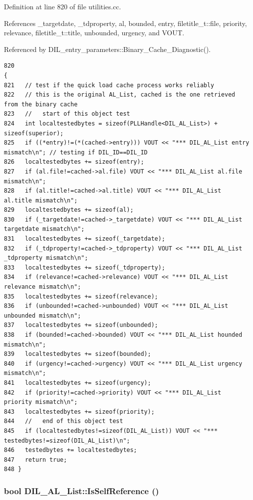 Definition at line 820 of file utilities.cc.

References \_\-targetdate, \_\-tdproperty, al, bounded, entry, filetitle\_\-t::file, priority, relevance, filetitle\_\-t::title, unbounded, urgency, and VOUT.

Referenced by DIL\_\-entry\_\-parameters::Binary\_\-Cache\_\-Diagnostic().



\footnotesize\begin{verbatim}820                                                                                  {
821   // test if the quick load cache process works reliably
822   // this is the original AL_List, cached is the one retrieved from the binary cache
823   //   start of this object test
824   int localtestedbytes = sizeof(PLLHandle<DIL_AL_List>) + sizeof(superior);
825   if ((*entry)!=(*(cached->entry))) VOUT << "*** DIL_AL_List entry mismatch\n"; // testing if DIL_ID==DIL_ID
826   localtestedbytes += sizeof(entry);
827   if (al.file!=cached->al.file) VOUT << "*** DIL_AL_List al.file mismatch\n";
828   if (al.title!=cached->al.title) VOUT << "*** DIL_AL_List al.title mismatch\n";
829   localtestedbytes += sizeof(al);
830   if (_targetdate!=cached->_targetdate) VOUT << "*** DIL_AL_List targetdate mismatch\n";
831   localtestedbytes += sizeof(_targetdate);
832   if (_tdproperty!=cached->_tdproperty) VOUT << "*** DIL_AL_List _tdproperty mismatch\n";
833   localtestedbytes += sizeof(_tdproperty);
834   if (relevance!=cached->relevance) VOUT << "*** DIL_AL_List relevance mismatch\n";
835   localtestedbytes += sizeof(relevance);
836   if (unbounded!=cached->unbounded) VOUT << "*** DIL_AL_List unbounded mismatch\n";
837   localtestedbytes += sizeof(unbounded);
838   if (bounded!=cached->bounded) VOUT << "*** DIL_AL_List hounded mismatch\n";
839   localtestedbytes += sizeof(bounded);
840   if (urgency!=cached->urgency) VOUT << "*** DIL_AL_List urgency mismatch\n";
841   localtestedbytes += sizeof(urgency);
842   if (priority!=cached->priority) VOUT << "*** DIL_AL_List priority mismatch\n";
843   localtestedbytes += sizeof(priority);
844   //   end of this object test
845   if (localtestedbytes!=sizeof(DIL_AL_List)) VOUT << "*** testedbytes!=sizeof(DIL_AL_List)\n";
846   testedbytes += localtestedbytes;
847   return true;
848 }
\end{verbatim}\normalsize 
{}
\subsubsection{\setlength{\rightskip}{0pt plus 5cm}bool DIL\_\-AL\_\-List::Is\-Self\-Reference ()\hspace{0.3cm}{\tt  [inline]}}\label{classDIL__AL__List_a4}




